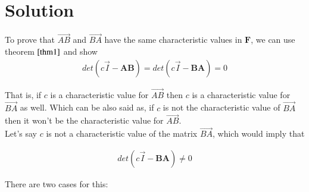 \documentclass[journal,12pt,twocolumn]{IEEEtran}
\begin{document}
	\section{Solution}
	
	To prove that $\vec{AB}$ and $\vec{BA}$ have the same characteristic values in $\mathbf{F}$, we can use theorem $\ref{thm1}$ and show
	\begin{align}\label{eq1}
		det\left(c\vec{I}-\mathbf{AB}\right) = det\left(c\vec{I}-\mathbf{BA}\right) = 0
	\end{align}
	
	That is, if $c$ is a characteristic value for $\vec{AB}$ then $c$ is a characteristic value for $\vec{BA}$ as well. Which can be also said as, if $c$ is not the characteristic value of $\vec{BA}$ then it won't be the characteristic value for $\vec{AB}$. \\
	
	Let's say $c$ is not a characteristic value of the matrix $\vec{BA}$, which would imply that 
	
	\begin{align}\label{eq1}
		det(c\vec{I}-\mathbf{BA}) \neq 0
	\end{align}
	
	There are two cases for this:
	
\end{document}
